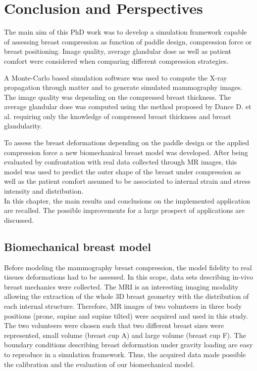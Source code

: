 
\chapter{Conclusion and Perspectives}\label{section:generalconclusion}


The main aim of this PhD work was to develop a simulation framework capable of assessing breast compression as function of paddle design, compression force or breast positioning. Image quality, average glandular dose as well as patient comfort were considered when comparing different compression strategies.

 A Monte-Carlo based simulation software was used to compute the X-ray propagation through matter and to generate simulated mammography images. The image quality was depending on the compressed breast thickness. The average glandular dose was computed using the method proposed by Dance D. et al. \citep{dance_additional_2000} requiring only the knowledge of compressed breast thickness and breast glandularity. 
 
 To assess the breast deformations depending on the paddle design or the applied compression force a new biomechanical breast model was developed. After being evaluated by confrontation with real data collected through MR images, this model was used to predict the outer shape of the breast under compression as well as	 the patient comfort assumed to be associated to internal strain and stress intensity and distribution.\\
 
 
 
 In this chapter, the main results and conclusions on the implemented application are recalled. The possible improvements for a large prospect of applications are discussed. 
 \clearpage
 \section{Biomechanical breast model }
  Before modeling the mammography breast compression, the model fidelity to real tissues deformations had to be assessed. In this  scope, data sets describing in-vivo breast mechanics were collected. The MRI is an interesting imaging modality allowing the extraction of the whole 3D breast geometry with the distribution of each internal structure.  Therefore, MR images of two volunteers in three body positions (prone, supine and supine tilted) were acquired and used in this study. The two volunteers were chosen such that two different breast sizes were represented, small volume (breast cup A) and large volume (breast cup F). The boundary conditions describing breast deformation under gravity loading are easy to reproduce in a simulation framework. Thus, the acquired data made possible the calibration and the evaluation of our biomechanical model.
   

